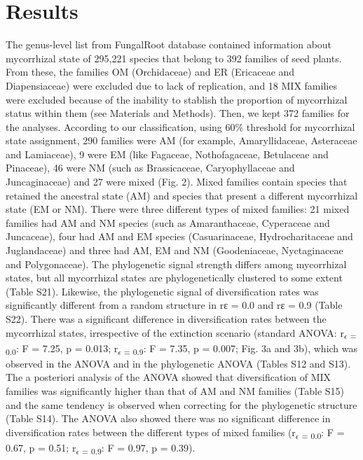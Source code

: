 \documentclass[
  12pt,
]{article}
\begin{document}
\hypertarget{results}{%
\section{Results}\label{results}}

The genus-level list from FungalRoot database contained information
about mycorrhizal state of 295,221 species that belong to 392 families
of seed plants. From these, the families OM (Orchidaceae) and ER
(Ericaceae and Diapensiaceae) were excluded due to lack of replication,
and 18 MIX families were excluded because of the inability to stablish
the proportion of mycorrhizal status within them (see Materials and
Methods). Then, we kept 372 families for the analyses. According to our
classification, using 60\% threshold for mycorrhizal state assignment,
290 families were AM (for example, Amaryllidaceae, Asteraceae and
Lamiaceae), 9 were EM (like Fagaceae, Nothofagaceae, Betulaceae and
Pinaceae), 46 were NM (such as Brassicaceae, Caryophyllaceae and
Juncaginaceae) and 27 were mixed (Fig. 2). Mixed families contain
species that retained the ancestral state (AM) and species that present
a different mycorrhizal state (EM or NM). There were three different
types of mixed families: 21 mixed families had AM and NM species (such
as Amaranthaceae, Cyperaceae and Juncaceae), four had AM and EM species
(Casuarinaceae, Hydrocharitaceae and Juglandaceae) and three had AM, EM
and NM (Goodeniaceae, Nyctaginaceae and Polygonaceae). The phylogenetic
signal strength differs among mycorrhizal states, but all mycorrhizal
states are phylogenetically clustered to some extent (Table S21).
Likewise, the phylogenetic signal of diversification rates was
significantly different from a random structure in rɛ = 0.0 and rɛ = 0.9
(Table S22). There was a significant difference in diversification rates
between the mycorrhizal states, irrespective of the extinction scenario
(standard ANOVA: r\textsubscript{$\epsilon$ = 0.0}: F = 7.25, p = 0.013;
r\textsubscript{$\epsilon$ = 0.9}: F = 7.35, p = 0.007; Fig. 3a and 3b),
which was observed in the ANOVA and in the phylogenetic ANOVA (Tables
S12 and S13). The a posteriori analysis of the ANOVA showed that
diversification of MIX families was significantly higher than that of AM
and NM families (Table S15) and the same tendency is observed when
correcting for the phylogenetic structure (Table S14). The ANOVA also
showed there was no significant difference in diversification rates
between the different types of mixed families
(r\textsubscript{$\epsilon$ = 0.0}: F = 0.67, p = 0.51;
r\textsubscript{$\epsilon$ = 0.9}: F = 0.97, p = 0.39).
\end{document}
